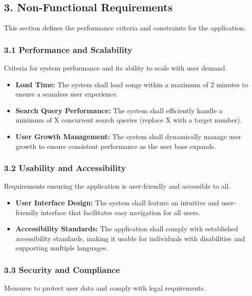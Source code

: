 \documentclass[a4paper,10pt]{article}
\begin{document}
\subsection*{3. Non-Functional Requirements}
This section defines the performance criteria and constraints for the application.

\subsubsection*{3.1 Performance and Scalability}
Criteria for system performance and its ability to scale with user demand.

\begin{itemize}[leftmargin=*]
    \item \textbf{Load Time:} The system shall load songs within a maximum of 2 minutes to ensure a seamless user experience.
    \item \textbf{Search Query Performance:} The system shall efficiently handle a minimum of X concurrent search queries (replace X with a target number).
    \item \textbf{User Growth Management:} The system shall dynamically manage user growth to ensure consistent performance as the user base expands.
\end{itemize}

\subsubsection*{3.2 Usability and Accessibility}
Requirements ensuring the application is user-friendly and accessible to all.

\begin{itemize}[leftmargin=*]
    \item \textbf{User Interface Design:} The system shall feature an intuitive and user-friendly interface that facilitates easy navigation for all users.
    \item \textbf{Accessibility Standards:} The application shall comply with established accessibility standards, making it usable for individuals with disabilities and supporting multiple languages.
\end{itemize}

\subsubsection*{3.3 Security and Compliance}
Measures to protect user data and comply with legal requirements.
\end{document}
